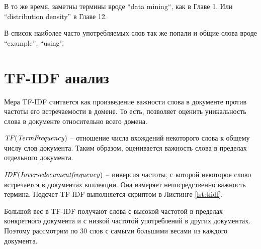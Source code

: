 \documentclass[12pt, a4paper] {article}
\begin{document}
В то же время, заметны термины вроде ``data mining``, как в Главе 1. Или ``distribution density'' в Главе 12.

В список наиболее часто употребляемых слов так же попали и общие слова вроде ``example'', ``using''.

\section{TF-IDF анализ}

Мера TF-IDF считается как произведение важности слова в документе против частоты его встречаемости в домене. То есть, позволяет оценить уникальность слова в документе относительно всего домена.

$\it{TF (Term Frequency)}$ -- отношение числа вхождений некоторого слова к общему числу
слов документа. Таким образом, оценивается важность слова в пределах отдельного документа.

$\it IDF (Inverse  document  frequency)$ -- инверсия частоты, с которой некоторое слово
встречается в документах коллекции. Она измеряет непосредственно важность термина.
Подсчет TF-IDF выполняется скриптом в Листинге \ref {lst:tfidf}.

Большой вес в TF-IDF получают слова с высокой частотой в пределах конкретного
документа и с низкой частотой употреблений в других документах. Поэтому рассмотрим по 30
слов с самыми большими весами из каждого документа.
\end{document}

